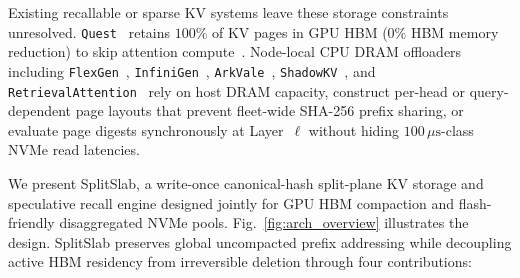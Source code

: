 \documentclass[final,5p,times,twocolumn]{elsarticle}
\theoremstyle{definition}
\theoremstyle{remark}
\newcommand{\SplitSlab}{\textup{\textsc{SplitSlab}}}
\def\SplitSlab{SplitSlab}%
\begin{document}
Existing recallable or sparse KV systems leave these storage constraints unresolved. \texttt{Quest}~\cite{tang2024quest} retains $100\%$ of KV pages in GPU HBM ($0\%$ HBM memory reduction) to skip attention compute~\cite{dao2022flashattention}. Node-local CPU DRAM offloaders including \texttt{FlexGen}~\cite{sheng2023flexgen}, \texttt{InfiniGen}~\cite{lee2024infinigen}, \texttt{ArkVale}~\cite{chen2024arkvale}, \texttt{ShadowKV}~\cite{sun2025shadowkv}, and \texttt{RetrievalAttention}~\cite{liu2024retrievalattention} rely on host DRAM capacity, construct per-head or query-dependent page layouts that prevent fleet-wide SHA-256 prefix sharing, or evaluate page digests synchronously at Layer~$\ell$ without hiding $100\,\mu\mathrm{s}$-class NVMe read latencies.

We present \SplitSlab{}, a write-once canonical-hash split-plane KV storage and speculative recall engine designed jointly for GPU HBM compaction and flash-friendly disaggregated NVMe pools. Fig.~\ref{fig:arch_overview} illustrates the design. \SplitSlab{} preserves global uncompacted prefix addressing while decoupling active HBM residency from irreversible deletion through four contributions:
\end{document}
